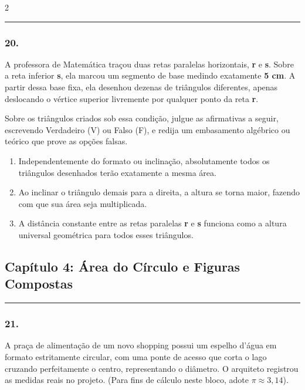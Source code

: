 \documentclass[twoside, 10pt, a4paper]{article}
\newlength{\espacoPosTitulo}\setlength{\espacoPosTitulo}{0.3cm}
\newlength{\espacoPreQuestao}\setlength{\espacoPreQuestao}{0.1cm}
\newlength{\espacoQuestao}\setlength{\espacoQuestao}{0.2cm}
\newlength{\espacoAlt}\setlength{\espacoAlt}{0.2cm}
\begin{document}
\begin{multicols*}{2}
\noindent\textcolor{CorLinha}{\rule{\linewidth}{0.5pt}} 
\par\vspace{\espacoPreQuestao}
\subsubsection*{20.} A professora de Matemática traçou duas retas paralelas horizontais, \textbf{r} e \textbf{s}. Sobre a reta inferior \textbf{s}, ela marcou um segmento de base medindo exatamente \textbf{5 cm}. A partir dessa base fixa, ela desenhou dezenas de triângulos diferentes, apenas deslocando o vértice superior livremente por qualquer ponto da reta \textbf{r}.

Sobre os triângulos criados sob essa condição, julgue as afirmativas a seguir, escrevendo Verdadeiro (V) ou Falso (F), e redija um embasamento algébrico ou teórico que prove as opções falsas.

\begin{enumerate}[label=\Roman*., itemsep=\espacoAlt]
\item Independentemente do formato ou inclinação, absolutamente todos os triângulos desenhados terão exatamente a mesma área.
\item Ao inclinar o triângulo demais para a direita, a altura se torna maior, fazendo com que sua área seja multiplicada.
\item A distância constante entre as retas paralelas \textbf{r} e \textbf{s} funciona como a altura universal geométrica para todos esses triângulos.
\end{enumerate}
\par\vspace{\espacoQuestao}

\subsection*{Capítulo 4: Área do Círculo e Figuras Compostas}
\vspace{-0.2cm}\noindent\rule{\linewidth}{1.5pt} 
\par\vspace{\espacoPosTitulo}
\subsubsection*{21.} A praça de alimentação de um novo shopping possui um espelho d'água em formato estritamente circular, com uma ponte de acesso que corta o lago cruzando perfeitamente o centro, representando o diâmetro. O arquiteto registrou as medidas reais no projeto. (Para fins de cálculo neste bloco, adote $ \pi \approx 3,14 $).


\end{multicols*}
\end{document}
